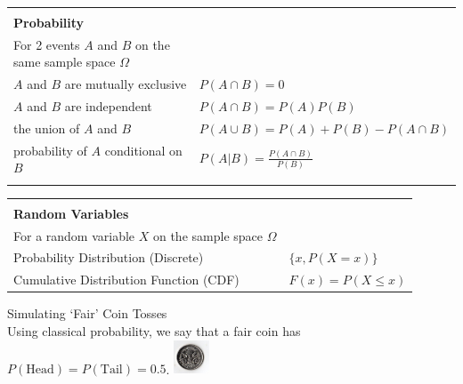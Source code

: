 \documentclass[bigtut]{tutorial}\usepackage[]{graphicx}\usepackage[]{color}
\begin{document}

\begin{tutorial}


\begin{center}
\begin{tabular}{| ll |} \hline
& \\
{\bf Probability} &  \\
For 2 events $A$ and $B$ on the same sample space $\Omega$  & \\
$A$ and $B$ are mutually exclusive &   $P(A \cap B) = 0$    \\
$A$ and $B$ are independent & $P(A \cap B) = P(A) P(B)$      \\ 
the union of $A$ and $B$  & $P(A \cup B) = P(A) +  P(B) - P(A \cap B)$   \\
probability of $A$ conditional on $B$  & $P(A|B) = \frac{ P(A \cap B) }{ P(B) } $ \\ 
& \\  \hline
\end{tabular}
\end{center}

\begin{center}
\begin{tabular}{| ll |} \hline
& \\
{\bf Random Variables} &  \\
For a random variable $X$ on the sample space $\Omega$ & \\
Probability Distribution (Discrete) & $\{ x, P(X=x) \}$     \\
Cumulative Distribution Function (CDF) &   $F(x) = P(X \leq x)$    \\ \hline
\end{tabular}
\end{center}


\begin{questions}
\vspace{.5cm}
\question Simulating `Fair' Coin Tosses \\
Using classical probability, we say that a fair coin has $P(\mbox{Head}) = P(\mbox{Tail}) = 0.5$.  
\includegraphics[height=1cm]{5c.jpg} \\


\end{questions}
\end{tutorial}
\end{document}
